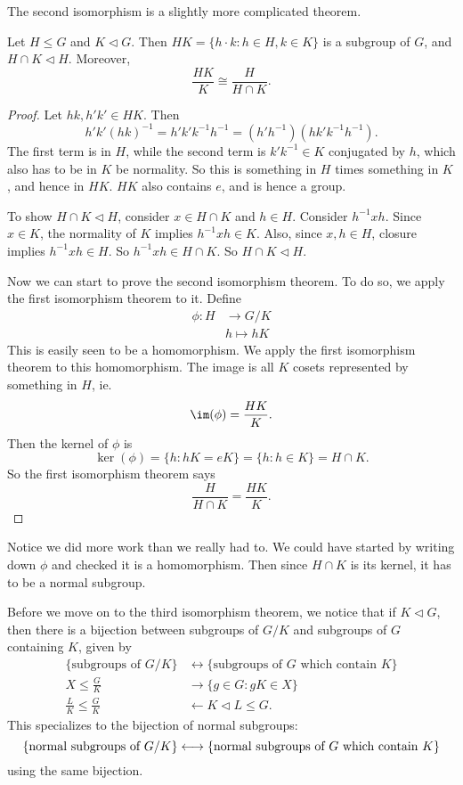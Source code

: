 \documentclass[a4paper]{article}
\begin{document}
The second isomorphism is a slightly more complicated theorem.
\begin{thm}
  Let $H \leq G$ and $K \lhd G$. Then $HK = \{h\cdot k: h \in H, k \in K\}$ is a subgroup of $G$, and $H\cap K \lhd H$. Moreover,
  \[
    \frac{HK}{K} \cong \frac{H}{H \cap K}.
  \]
\end{thm}

\begin{proof}
  Let $hk, h'k' \in HK$. Then
  \[
    h'k'(hk)^{-1} = h'k' k^{-1}h^{-1} = (h'h^{-1})(hk'k^{-1}h^{-1}).
  \]
  The first term is in $H$, while the second term is $k'k^{-1} \in K$ conjugated by $h$, which also has to be in $K$ be normality. So this is something in $H$ times something in $K$, and hence in $HK$. $HK$ also contains $e$, and is hence a group.

  To show $H \cap K \lhd H$, consider $x \in H\cap K$ and $h \in H$. Consider $h^{-1} x h$. Since $x \in K$, the normality of $K$ implies $h^{-1}xh \in K$. Also, since $x, h \in H$, closure implies $h^{-1}xh \in H$. So $h^{-1} x h \in H \cap K$. So $H \cap K \lhd H$.

  Now we can start to prove the second isomorphism theorem. To do so, we apply the first isomorphism theorem to it. Define
  \begin{align*}
    \phi: H &\to G/K\\
    &h \mapsto hK
  \end{align*}
  This is easily seen to be a homomorphism. We apply the first isomorphism theorem to this homomorphism. The image is all $K$ cosets represented by something in $H$, ie.
  \[
    \im (\phi) = \frac{HK}{K}.
  \]
  Then the kernel of $\phi$ is
  \[
    \ker(\phi) = \{h: hK = eK\} = \{h: h \in K\} = H \cap K.
  \]
  So the first isomorphism theorem says
  \[
    \frac{H}{H \cap K} = \frac{HK}{K}.
  \]
\end{proof}
Notice we did more work than we really had to. We could have started by writing down $\phi$ and checked it is a homomorphism. Then since $H \cap K$ is its kernel, it has to be a normal subgroup.

Before we move on to the third isomorphism theorem, we notice that if $K \lhd G$, then there is a bijection between subgroups of $G/K$ and subgroups of $G$ containing $K$, given by
\begin{align*}
  \{\text{subgroups of }G/K\} &\longleftrightarrow\{\text{subgroups of }G\text{ which contain }K\}\\
  X \leq \frac{G}{K} &\longrightarrow \{g \in G: gK \in X\}\\
  \frac{L}{K} \leq \frac{G}{K} &\longleftarrow K \lhd L \leq G.
\end{align*}
This specializes to the bijection of normal subgroups:
\[
  \{\text{normal subgroups of }G/K\} \longleftrightarrow\{\text{normal subgroups of }G\text{ which contain }K\}\\
\]
using the same bijection.
\end{document}
